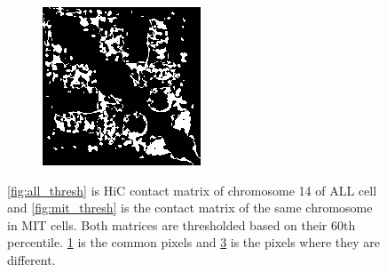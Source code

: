 \documentclass{article}
\begin{document}
\begin{figure}[H]
\begin{subfigure}[b]{.45\textwidth}
        \caption{}
        \label{fig:all_mit_common}
    \end{subfigure}
    \begin{subfigure}[b]{.45\textwidth}
        \includegraphics[width=\textwidth]{figures/ALL_MIT_diff.png}
        \caption{}
        \label{fig:all_mit_diff}
    \end{subfigure}
    \caption{\ref{fig:all_thresh} is HiC contact matrix of 
             chromosome 14 of ALL cell and
             \ref{fig:mit_thresh} is the contact matrix of
             the same chromosome in MIT cells. 
             Both matrices are thresholded based on their 60th
             percentile. \ref{fig:all_mit_common} is the common pixels
             and \ref{fig:all_mit_diff} is the pixels where they 
             are different.}
\end{figure}
%
\end{document}
